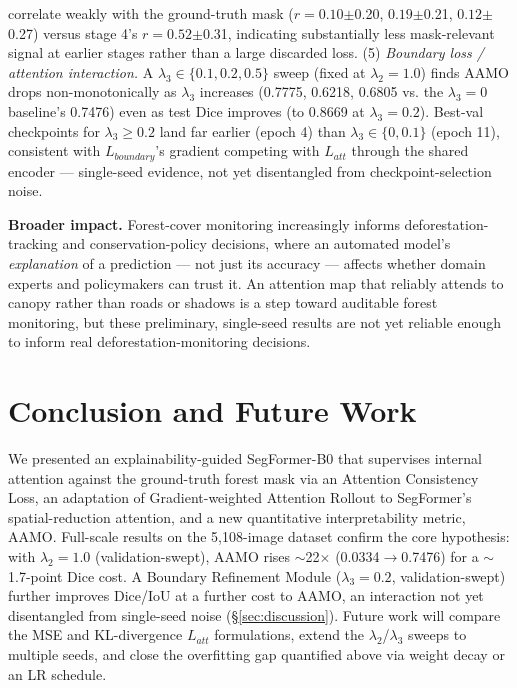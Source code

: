 \documentclass[sigconf,review]{acmart}
\begin{document}
correlate weakly with the ground-truth mask ($r{=}0.10${\small$\pm$}0.20,
$0.19${\small$\pm$}0.21, $0.12${\small$\pm$}0.27) versus stage 4's
$r{=}0.52${\small$\pm$}0.31, indicating substantially less mask-relevant
signal at earlier stages rather than a large discarded loss.
(5) \emph{Boundary loss / attention interaction.} A $\lambda_3 \in
\{0.1, 0.2, 0.5\}$ sweep (fixed at $\lambda_2{=}1.0$) finds AAMO drops
non-monotonically as $\lambda_3$ increases (0.7775, 0.6218, 0.6805 vs. the
$\lambda_3{=}0$ baseline's 0.7476) even as test Dice improves (to 0.8669 at
$\lambda_3{=}0.2$). Best-val checkpoints for $\lambda_3{\ge}0.2$ land far
earlier (epoch 4) than $\lambda_3{\in}\{0,0.1\}$ (epoch 11), consistent with
$L_{boundary}$'s gradient competing with $L_{att}$ through the shared
encoder --- single-seed evidence, not yet disentangled from
checkpoint-selection noise.

\textbf{Broader impact.} Forest-cover monitoring increasingly informs
deforestation-tracking and conservation-policy decisions, where an
automated model's \emph{explanation} of a prediction --- not just its
accuracy --- affects whether domain experts and policymakers can trust it.
An attention map that reliably attends to canopy rather than roads or
shadows is a step toward auditable forest monitoring, but these preliminary,
single-seed results are not yet reliable enough to inform real
deforestation-monitoring decisions.

\section{Conclusion and Future Work}
We presented an explainability-guided SegFormer-B0 that supervises internal
attention against the ground-truth forest mask via an Attention Consistency
Loss, an adaptation of Gradient-weighted Attention Rollout to SegFormer's
spatial-reduction attention, and a new quantitative interpretability
metric, AAMO. Full-scale results on the 5{,}108-image dataset confirm the
core hypothesis: with $\lambda_2{=}1.0$ (validation-swept), AAMO rises
$\sim$22$\times$ (0.0334$\to$0.7476) for a $\sim$1.7-point Dice cost. A
Boundary Refinement Module ($\lambda_3{=}0.2$, validation-swept) further
improves Dice/IoU at a further cost to AAMO, an interaction not yet
disentangled from single-seed noise (\S\ref{sec:discussion}). Future work
will compare the MSE and KL-divergence $L_{att}$ formulations, extend the
$\lambda_2$/$\lambda_3$ sweeps to multiple seeds, and close the overfitting
gap quantified above via weight decay or an LR schedule.



\end{document}
